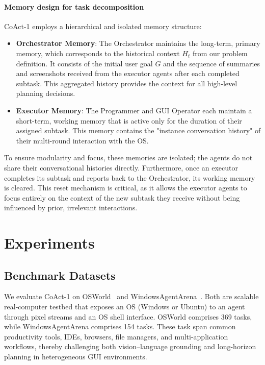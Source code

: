 \documentclass{article} %
\newcommand{\ours}{CoAct-1\xspace}
\begin{document}
\paragraph{Memory design for task decomposition}
\ours employs a hierarchical and isolated memory structure:
\begin{itemize}[leftmargin=0.3cm, itemindent=0cm]
    \item \textbf{Orchestrator Memory}: The Orchestrator maintains the long-term, primary memory, which corresponds to the historical context $H_t$ from our problem definition. It consists of the initial user goal $G$ and the sequence of summaries and screenshots received from the executor agents after each completed subtask. This aggregated history provides the context for all high-level planning decisions.
    \item \textbf{Executor Memory}: The Programmer and GUI Operator each maintain a short-term, working memory that is active only for the duration of their assigned subtask. This memory contains the "instance conversation history" of their multi-round interaction with the OS.
\end{itemize}
To ensure modularity and focus, these memories are isolated; the agents do not share their conversational histories directly. Furthermore, once an executor completes its subtask and reports back to the Orchestrator, its working memory is cleared. This reset mechanism is critical, as it allows the executor agents to focus entirely on the context of the new subtask they receive without being influenced by prior, irrelevant interactions.


\section{Experiments}
\subsection{Benchmark Datasets}
We evaluate  \ours  on  OSWorld~\citep{xie2024osworldbenchmarkingmultimodalagents} and WindowsAgentArena~\citep{bonatti2024windowsagentarenaevaluating}. Both are scalable real‑computer testbed that exposes an OS (Windows or Ubuntu) to an agent through  pixel streams and an OS shell interface. OSWorld comprises 369 tasks, while WindowsAgentArena comprises 154 tasks. These task span common productivity tools, IDEs, browsers, file managers, and multi-application workflows, thereby challenging both vision–language grounding and long-horizon planning in heterogeneous GUI environments.
\end{document}
